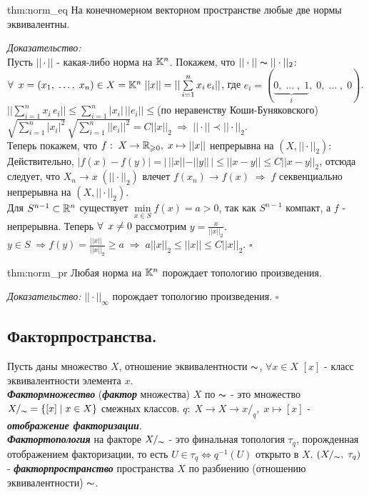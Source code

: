 \documentclass[../../main.tex]{subfiles}
\begin{document}
\begin{theo}[]{thm:norm_eq}
На конечномерном векторном пространстве любые две нормы эквивалентны.
\end{theo}
\textit{Доказательство:}\\
Пусть $||\cdot||$ - какая-либо норма на $\mathbb{K}^n$. Покажем, что $||\cdot||\thicksim ||\cdot||_2$:\\
$\forall\:\; x = (x_1,\;\ldots,\;x_n)\in X = \mathbb{K}^n\; ||x|| = ||\sum\limits_{i=1}^n x_i\,e_i|| $, где $e_i = (\underbrace{0,\;\ldots\;,\; 1}_i,\;0,\;\ldots\;,\;0)$. $||\sum\limits_{i=1}^n x_i\,e_i|| \leq \sum\limits_{i=1}^n|x_i|\, ||e_i||\leq$(по неравенству Коши-Буняковского) $\sqrt{\sum\limits_{i=1}^n|x_i|^2}\,\sqrt{\sum\limits_{i=1}^n ||e_i||^2} = C ||x||_2\;\Rightarrow \; ||\cdot|| \prec ||\cdot||_2$.\\
Теперь покажем, что $f:\; X\rightarrow \mathbb{R}_{\geqslant 0},\; x\mapsto ||x||$ непрерывна на $(X, ||\cdot||_2)$:
Действительно, $|f(x)-f(y)| = |\,||x||-||y||\,|\leq ||x-y||\leq C||x-y||_2$, отсюда следует, что $X_n\rightarrow x\;(||\cdot||_2)$ влечет $f(x_n)\rightarrow f(x)\;\Rightarrow\;f$ секвенциально непрерывна на $(X,||\cdot||_2)$.\\
Для $S^{n-1}\subset\mathbb{R}^n$ существует $\min\limits_{x\in S}f(x) = a > 0$, так как $S^{n-1}$ компакт, а $f$ - непрерывна. Теперь $\forall\:\; x\neq 0$ рассмотрим $y = \frac x{||x||_2}$. $y\in S\; \Rightarrow f(y) = \frac {||x||\;\,}{||x||_2}\geq a\;\Rightarrow \; a||x||_2\leq||x||\leq C||x||_2 $. $\square$  

\begin{theo}{thm:norm_pr}
Любая норма на $\mathbb{K}^n$ порождает топологию произведения.
\end{theo}
\textit{Доказательство:} $||\cdot||_\infty$ порождает топологию произведения. $\square$

\subsection{Факторпространства.}
Пусть даны множество $X$, отношение эквивалентности $\thicksim$, $\forall x\in X$  $[x]$ - класс эквивалентности элемента $x$.\\
 \textbf{\textit{Фактормножество}} (\textbf{\textit{фактор}} множества) $X$ по $\thicksim$ - это множество $X/_\thicksim = \{[x]\;|\;x\in X\}$ смежных классов. $q:\;X\rightarrow X\rightarrow x/_q,\; x\mapsto [x]$ - \textbf{\textit{отображение факторизации}}.\\
 \textbf{\textit{Фактортопология}} на факторе $X/_\thicksim$ - это финальная топология $\tau_q$, порожденная отображением факторизации, то есть $U\in\tau_q \Leftrightarrow q^{-1}(U)$ открыто в $X$. $(X/_\thicksim,\;\tau_q)$ - \textbf{\textit{факторпространство}} пространства $X$ по разбиению (отношению эквивалентности) $\thicksim$. 
\end{document}
